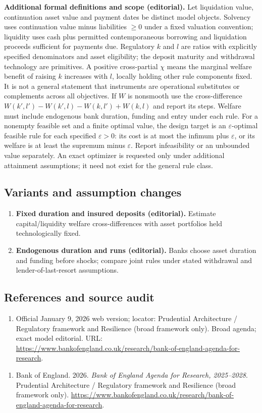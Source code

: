\documentclass[11pt,a4paper]{article}
\begin{document}
\textbf{Additional formal definitions and scope (editorial).} Let liquidation value, continuation asset value and payment dates be distinct model objects. Solvency uses continuation value minus liabilities \(\geq0\) under a fixed valuation convention; liquidity uses cash plus permitted contemporaneous borrowing and liquidation proceeds sufficient for payments due. Regulatory \(k\) and \(l\) are ratios with explicitly specified denominators and asset eligibility; the deposit maturity and withdrawal technology are primitives. A positive cross-partial \(\chi\) means the marginal welfare benefit of raising \(k\) increases with \(l\), locally holding other rule components fixed. It is not a general statement that instruments are operational substitutes or complements across all objectives. If \(W\) is nonsmooth use the cross-difference \(W(k',l')-W(k',l)-W(k,l')+W(k,l)\) and report its steps. Welfare must include endogenous bank duration, funding and entry under each rule. For a nonempty feasible set and a finite optimal value, the design target is an \(\varepsilon\)-optimal feasible rule for each specified \(\varepsilon>0\): its cost is at most the infimum plus \(\varepsilon\), or its welfare is at least the supremum minus \(\varepsilon\). Report infeasibility or an unbounded value separately. An exact optimizer is requested only under additional attainment assumptions; it need not exist for the general rule class.
\subsection*{Variants and assumption changes}
\begin{enumerate}
\item \textbf{Fixed duration and insured deposits (editorial).} Estimate capital/liquidity welfare cross-differences with asset portfolios held technologically fixed.
\item \textbf{Endogenous duration and runs (editorial).} Banks choose asset duration and funding before shocks; compare joint rules under stated withdrawal and lender-of-last-resort assumptions.
\end{enumerate}
\subsection*{References and source audit}
\begin{enumerate}
\item Official January 9, 2026 web version; locator: Prudential Architecture / Regulatory framework and Resilience (broad framework only). Broad agenda; exact model editorial. URL: \url{https://www.bankofengland.co.uk/research/bank-of-england-agenda-for-research}.
\end{enumerate}
\begin{enumerate}\raggedright
\item\hypertarget{definitions:source:30007603:1}{} Bank of England. 2026. \emph{Bank of England Agenda for Research, 2025–2028}. Prudential Architecture / Regulatory framework and Resilience (broad framework only).
\url{https://www.bankofengland.co.uk/research/bank-of-england-agenda-for-research}.
\end{enumerate}
\end{document}
